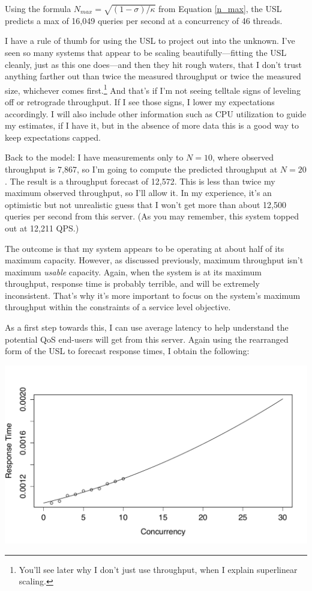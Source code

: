 \documentclass{vivid_layout}
\begin{document}
Using the formula $N_{max}=\sqrt{(1-\sigma)/\kappa}$ from Equation \ref{n_max}, the USL predicts a
max of 16,049 queries per second at a concurrency of 46 threads.

I have a rule of thumb for using the USL to project out into the unknown. I've
seen so many systems that appear to be scaling beautifully---fitting the
USL cleanly, just as this one does---and then they hit rough waters, that I don't trust
anything farther out than twice the measured throughput or twice the
measured size, whichever comes first.\footnote{You'll see later why I don't just
use throughput, when I explain superlinear scaling.} And that's if I'm not seeing
telltale signs of leveling off or retrograde throughput. If I see those signs, I
lower my expectations accordingly. I will also include other information such as
CPU utilization to guide my estimates, if I have it, but in the absence of more
data this is a good way to keep expectations capped.

Back to the model: I have measurements only to $N=10$, where observed throughput
is 7,867, so I'm going to compute the predicted throughput at $N=20$. The result
is a throughput forecast of 12,572. This is less than twice my maximum
observed throughput, so I'll allow it. In my experience, it's an optimistic but
not unrealistic guess that I won't get more than about 12,500 queries per second
from this server. (As you may remember, this system topped out at 12,211 QPS.)

The outcome is that my system appears to be operating at about half of its
maximum capacity. However, as discussed previously, maximum throughput isn't
maximum {\itshape usable} capacity. Again, when the system is at its maximum
throughput, response time is probably terrible, and will be extremely
inconsistent. That's why it's more important to focus on the system's maximum
throughput within the constraints of a service level objective.

As a first step towards this, I can use average latency to help understand the
potential QoS end-users will get from this server. Again using the rearranged
form of the USL to forecast response times, I obtain the following:
\begin{center}
\includegraphics[width=.85\linewidth]{scalability/cisco-3}
\end{center}
\end{document}
